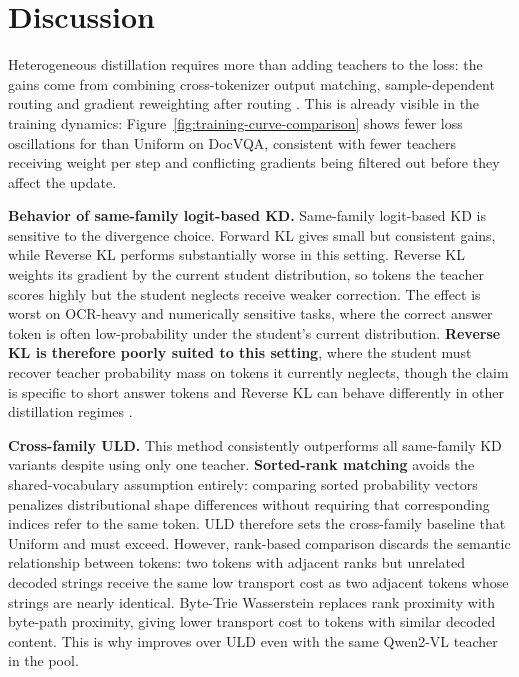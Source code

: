 \section{Discussion}
\label{sec:discussion}

Heterogeneous distillation requires more than adding teachers to the loss:
the gains come from combining cross-tokenizer output matching, sample-dependent
routing and gradient reweighting after routing
\cite{hinton2015distillingknowledgeneuralnetwork,boizard2024towardscrosstokenizerdistillation,peyre2019computationaloptimaltransport,fedus2022switchtransformersscalingtrillion}.
This is already visible in the training dynamics: Figure~\ref{fig:training-curve-comparison}
shows fewer loss oscillations for \methodname{} than Uniform on DocVQA,
consistent with fewer teachers receiving weight per step and conflicting
gradients being filtered out before they affect the update.

\textbf{Behavior of same-family logit-based KD.}
Same-family logit-based KD is sensitive to the divergence choice. Forward KL
gives small but consistent gains, while Reverse KL performs substantially worse
in this setting. Reverse KL weights its gradient by the current student distribution, so
tokens the teacher scores highly but the student neglects receive weaker
correction. The effect is worst on OCR-heavy and numerically sensitive tasks, where the
correct answer token is often low-probability under the student's current
distribution. \textbf{Reverse KL is therefore poorly suited to this setting}, where the student must
recover teacher probability mass on tokens it currently neglects, though the
claim is specific to short answer tokens and Reverse KL can behave differently
in other distillation regimes \cite{wu2025rethinking}.

\textbf{Cross-family ULD.}
This method consistently outperforms all same-family KD variants despite using only one
teacher. \textbf{Sorted-rank matching} avoids the shared-vocabulary assumption entirely:
comparing sorted probability vectors penalizes distributional shape differences
without requiring that corresponding indices refer to the same token. ULD
therefore sets the cross-family baseline that Uniform and \methodname{} must exceed.
However, rank-based comparison discards the semantic relationship between
tokens: two tokens with adjacent ranks but unrelated decoded strings receive
the same low transport cost as two adjacent tokens whose strings are nearly
identical. Byte-Trie Wasserstein replaces rank proximity with byte-path
proximity, giving lower transport cost to tokens with similar decoded content.
This is why \methodname{} improves over ULD even with the same Qwen2-VL teacher
in the pool.

